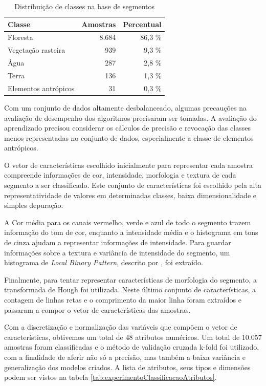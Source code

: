 \begin{table}[h]
\centering
\begin{tabulary}{\linewidth}{|L|R|R|}
\hline
\textbf{Classe} & \textbf{Amostras} & \textbf{Percentual} \\ \hline
Floresta             & 8.684 & 86,3 \% \\ \hline
Vegetação rasteira   &   939 &  9,3 \% \\ \hline
Água                 &   287 &  2,8 \% \\ \hline
Terra                &   136 &  1,3 \% \\ \hline
Elementos antrópicos &    31 &  0,3 \% \\ \hline
\end{tabulary}
\caption{Distribuição de classes na base de segmentos}
\label{tab:experimentoRegioesDistribuicao}
\end{table}

Com um conjunto de dados altamente desbalanceado, algumas precauções na avaliação de desempenho dos algoritmos precisaram ser tomadas. A avaliação do aprendizado precisou considerar os cálculos de precisão e revocação das classes menos representadas no conjunto de dados, especialmente a classe de elementos antrópicos.

O vetor de características escolhido inicialmente para representar cada amostra compreende informações de cor, intensidade, morfologia e textura de cada segmento a ser classificado. Este conjunto de características foi escolhido pela alta representatividade de valores em determinadas classes, baixa dimensionalidade e simples depuração.

A Cor média para os canais vermelho, verde e azul de todo o segmento trazem informação do tom de cor, enquanto a intensidade média e o histograma em tons de cinza ajudam a representar informações de intensidade. Para guardar informações sobre a textura e variância de intensidade do segmento, um histograma de \textit{Local Binary Pattern}, descrito por , foi extraído.

Finalmente, para tentar representar características de morfologia do segmento, a transformada de Hough foi utilizada. Neste último conjunto de características, a contagem de linhas retas e o comprimento da maior linha foram extraídos e passaram a compor o vetor de características das amostras.

Com a discretização e normalização das variáveis que compõem o vetor de características, obtivemos um total de 48 atributos numéricos. Um total de 10.057 amostras foram classificadas e o método de validação cruzada k-fold foi utilizado, com a finalidade de aferir não só a precisão, mas também a baixa variância e generalização dos modelos criados. A lista de atributos, seus tipos e dimensões podem ser vistos na tabela \ref{tab:experimentoClassificacaoAtributos}.

